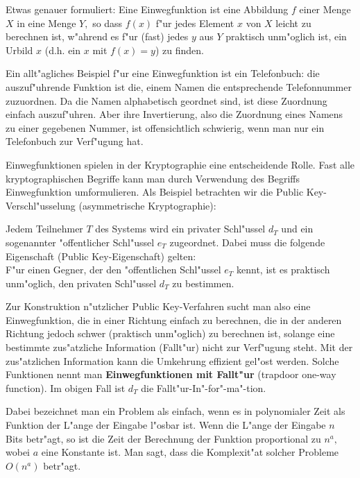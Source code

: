 Etwas genauer formuliert:  Eine Einwegfunktion ist eine Abbildung $ f $ einer Menge $ X $ in eine Menge $ Y, $ so dass $ f(x) $ f"ur jedes Element $ x $ von $ X $ leicht zu berechnen ist, w"ahrend es f"ur (fast) jedes $ y $ aus $ Y $  praktisch unm"oglich ist, ein Urbild $ x $ (d.h. ein $ x $ mit $ f(x)=y $) zu finden.\par

Ein allt"agliches Beispiel f"ur eine Einwegfunktion ist ein Telefonbuch: die auszuf"uhrende Funktion ist die, einem Namen die entsprechende Telefonnummer zuzuordnen. Da die Namen alphabetisch geordnet sind, ist diese Zuordnung einfach auszuf"uhren. Aber ihre Invertierung, also die Zuordnung eines Namens zu einer gegebenen Nummer, ist offensichtlich schwierig, wenn man nur ein Telefonbuch zur Verf"ugung hat. \par

Einwegfunktionen spielen in der Kryptographie eine entscheidende Rolle. Fast alle kryptographischen Begriffe kann man durch Verwendung des Begriffs Einwegfunktion umformulieren. Als Beispiel betrachten wir die Public Key-Verschl"usselung  (asymmetrische Kryptographie):\par

Jedem Teilnehmer $ T $ des Systems wird ein privater   Schl"ussel $ d_T $ und ein sogenannter "offentlicher Schl"ussel $ e_T $   zugeordnet. Dabei muss die folgende Eigenschaft (Public Key-Eigenschaft) gelten:\\
F"ur einen Gegner, der den "offentlichen Schl"ussel $ e_T $  kennt, ist es praktisch unm"oglich, den privaten Schl"ussel  $ d_T $ zu bestimmen.\par

Zur Konstruktion n"utzlicher Public Key-Verfahren sucht man also eine Einwegfunktion, die in einer Richtung \glqq einfach\grqq {} zu berechnen, die in der anderen Richtung jedoch \glqq schwer\grqq {} (praktisch unm"oglich) zu berechnen ist, solange eine bestimmte zus"atzliche Information  (Fallt"ur) nicht zur Verf"ugung steht. Mit der zus"atzlichen Information kann die Umkehrung effizient gel"ost werden. Solche Funktionen nennt man {\bf Einwegfunktionen mit Fallt"ur} (trapdoor one-way function). Im obigen Fall ist $ d_T $ die Fallt"ur-In"-for"-ma"-tion. \par

Dabei bezeichnet man ein Problem als \glqq einfach\grqq, wenn es in  polynomialer Zeit als Funktion der L"ange der Eingabe l"osbar ist. Wenn die L"ange der Eingabe $ n $ Bits betr"agt, so ist die Zeit der Berechnung der Funktion proportional zu $ n^{a}, $ wobei $ a $  eine Konstante ist. Man sagt, dass die  Komplexit"at solcher Probleme $ O(n^{a}) $ betr"agt. 


